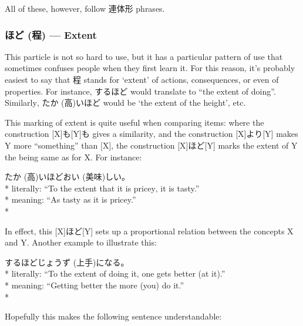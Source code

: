 \documentclass[11pt, b5paper, twoside, openright, onecolumn]{book}
\makeatletter
\newcommand*{\rubystack}[2]{{\relscale{0.5}%
  \begin{tabular}[b]{@{}c@{}}%
    {#1}\\%
   {\textscale{2}{#2}}%
  \end{tabular}}%
}
\DeclareRobustCommand*{\ruby}[2]{%
  \mbox{%
    \setlength{\parskip}{0ex}%
    \BeginAccSupp{method=pdfstringdef,ActualText={#1}}%
      \rubystack{\phantom{#2}}{#1}%
      \llap{%
        \rubystack{#2}{\phantom{#1}}%
      }%
    \EndAccSupp{}%
  }%
}
\renewcommand*{\ruby}[2]{#2 (#1)}%
\newenvironment{exampleblock}{
\setlength{\parindent}{0.6in}
\begin{minipage}[t]{\dimexpr\textwidth-\parindent}}
{\end{minipage}}
\makeatother
\begin{document}
All of these‚ however‚ follow 連体形 phrases.

\subsubsection{\ruby{程}{ほど} — Extent}

This particle is not so hard to use‚ but it has a particular pattern of use that sometimes confuses people when they first learn it. For this reason‚ it’s probably easiest to say that 程 stands for ‘extent’ of actions‚ consequences‚ or even of properties. For instance‚ するほど would translate to “the extent of doing”. Similarly‚ \ruby{高}{たか}いほど would be ‘the extent of the height’‚ etc.

This marking of extent is quite useful when comparing items: where the construction [X]も[Y]も gives a similarity‚ and the construction [X]より[Y] makes Y more “something” than [X]‚ the construction [X]ほど[Y] marks the extent of Y the being same as for X. For instance:

\vspace{0.4cm}
\begin{exampleblock}
\ruby{高}{たか}いほど\ruby{美味}{おい}しい。 \\* 
literally: “To the extent that it is pricey‚ it is tasty.” \\* 
meaning: “As tasty as it is pricey.” \\* 
\end{exampleblock}
\vspace{0.2cm}

In effect‚ this [X]ほど[Y] sets up a proportional relation between the concepts X and Y. Another example to illustrate this:

\vspace{0.4cm}
\begin{exampleblock}
するほど\ruby{上手}{じょうず}になる。 \\* 
literally: “To the extent of doing it‚ one gets better (at it).” \\* 
meaning: “Getting better the more (you) do it.” \\* 
\end{exampleblock}
\vspace{0.2cm}

Hopefully this makes the following sentence understandable:
\end{document}
